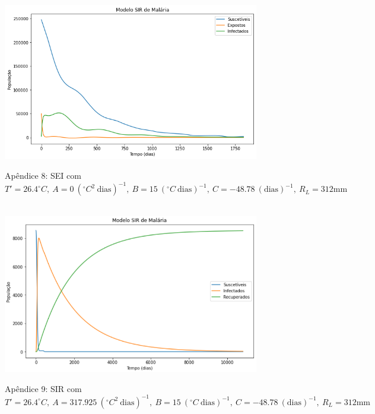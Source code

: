 \documentclass[12pt]{article}
\begin{document}
\begin{figure}[!ht]
        \centering
        \hbox{\hspace{2.0em} \includegraphics[scale=0.55] {SEI_Correcao_b3_A0.png}}
        \caption*{Apêndice 8: SEI com $T'=26.4^\circ C, \ A=0 \ (^\circ C^2 \ \text{dias})^{-1}, \ B=15 \ (^\circ C \ \text{dias})^{-1}, \ C=-48.78 \ (\text{dias})^{-1}, \ R_L=312 \text{mm}$}
\end{figure}
\newpage
\begin{figure}[!ht]
        \centering
        \hbox{\hspace{4.0em} \includegraphics[scale=0.6] {SIR_Correcao_max_A317.png}}
        \caption*{Apêndice 9: SIR com $T'=26.4^\circ C, \ A=317.925 \ (^\circ C^2 \ \text{dias})^{-1}, \ B=15 \ (^\circ C \ \text{dias})^{-1}, \ C=-48.78 \ (\text{dias})^{-1}, \ R_L=312 \text{mm}$}
\end{figure} 
\end{document}
